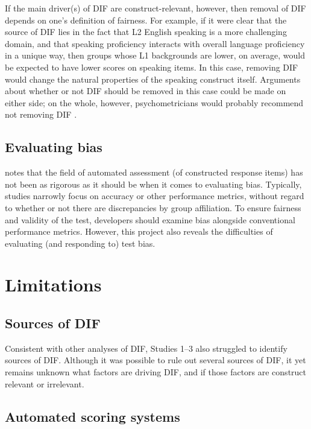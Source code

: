 \documentclass [PhD] {uclathes}
\begin{document}
If the main driver(s) of DIF are construct-relevant, however, then removal of DIF depends on one’s definition of fairness. For example, if it were clear that the source of DIF lies in the fact that L2 English speaking is a more challenging domain, and that speaking proficiency interacts with overall language proficiency in a unique way, then groups whose L1 backgrounds are lower, on average, would be expected to have lower scores on speaking items. In this case, removing DIF would change the natural properties of the speaking construct itself. Arguments about whether or not DIF should be removed in this case could be made on either side; on the whole, however, psychometricians would probably recommend not removing DIF \citep{aera2014}. 

\subsection{Evaluating bias}

\citet{ormerod2022automated} notes that the field of automated assessment (of constructed response items) has not been as rigorous as it should be when it comes to evaluating bias. Typically, studies narrowly focus on accuracy or other performance metrics, without regard to whether or not there are discrepancies by group affiliation. To ensure fairness and validity of the test, developers should examine bias alongside conventional performance metrics. However, this project also reveals the difficulties of evaluating (and responding to) test bias. 

\section{Limitations}

\subsection{Sources of DIF}

Consistent with other analyses of DIF, Studies 1–3 also struggled to identify sources of DIF. Although it was possible to rule out several sources of DIF, it yet remains unknown what factors are driving DIF, and if those factors are construct relevant or irrelevant. 

\subsection{Automated scoring systems}
\end{document}

